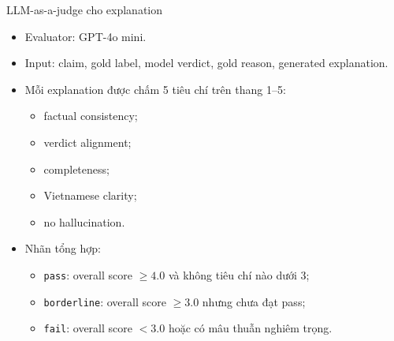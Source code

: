 \documentclass[aspectratio=169]{beamer}
\begin{document}
\begin{frame}{LLM-as-a-judge cho explanation}
  \begin{itemize}
    \item Evaluator: GPT-4o mini.
    \item Input: claim, gold label, model verdict, gold reason, generated explanation.
    \item Mỗi explanation được chấm 5 tiêu chí trên thang 1--5:
    \begin{itemize}
      \item factual consistency;
      \item verdict alignment;
      \item completeness;
      \item Vietnamese clarity;
      \item no hallucination.
    \end{itemize}
    \item Nhãn tổng hợp:
    \begin{itemize}
      \item \texttt{pass}: overall score $\ge 4.0$ và không tiêu chí nào dưới 3;
      \item \texttt{borderline}: overall score $\ge 3.0$ nhưng chưa đạt pass;
      \item \texttt{fail}: overall score $< 3.0$ hoặc có mâu thuẫn nghiêm trọng.
    \end{itemize}
  \end{itemize}
\end{frame}
\end{document}
